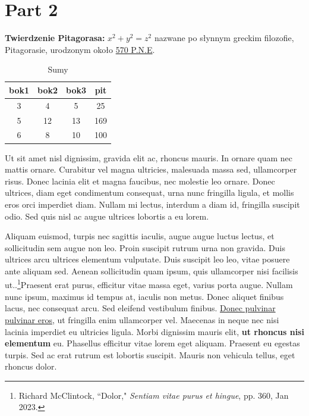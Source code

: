 \documentclass[12pt,a4paper]{article}
\begin{document}
\part{Part 2}
\textbf{Twierdzenie Pitagorasa:} \(x^2 + y^2 = z^2\) nazwane po słynnym greckim filozofie, Pitagorasie, urodzonym około \underline{570 P.N.E}.
\begin{table}[H]
		\centering
		\begin{tabular}{||c c c c||} 
			\hline
			bok1 & bok2 & bok3 & pit \\ [0.5ex] 
			\hline\hline
			3 & 4 & 5 & 25 \\ 
			\hline
			5 & 12 & 13 & 169 \\
			\hline
			6 & 8 & 10 & 100 \\ [1ex] 
			\hline
		\end{tabular}
\caption{Sumy}
\label{table: Sumy}
\end{table}
Ut sit amet nisl dignissim, gravida elit ac, rhoncus mauris. \cite{A2} In ornare quam nec mattis ornare. Curabitur vel magna ultricies, malesuada massa sed, ullamcorper risus. Donec lacinia elit et magna faucibus, nec molestie leo ornare. Donec ultrices, diam eget condimentum consequat, urna nunc fringilla ligula, et mollis eros orci imperdiet diam. Nullam mi lectus, interdum a diam id, fringilla suscipit odio. Sed quis nisl ac augue ultrices lobortis a eu lorem.

Aliquam euismod, turpis nec sagittis iaculis, augue augue luctus lectus, et sollicitudin sem augue non leo. Proin suscipit rutrum urna non gravida. Duis ultrices arcu ultrices elementum vulputate. Duis suscipit leo leo, vitae posuere ante aliquam sed. Aenean sollicitudin quam ipsum, quis ullamcorper nisi facilisis ut..\footnote{Richard McClintock, ``Dolor," \emph{Sentiam vitae purus et hingue}, pp. 360, Jan 2023.}Praesent erat purus, efficitur vitae massa eget, varius porta augue. Nullam nunc ipsum, maximus id tempus at, iaculis non metus. Donec aliquet finibus lacus, nec consequat arcu. Sed eleifend vestibulum finibus.  \underline{Donec pulvinar pulvinar eros}, ut fringilla enim ullamcorper vel. Maecenas in neque nec nisi lacinia imperdiet eu ultricies ligula. Morbi dignissim mauris elit, \textbf{ut rhoncus nisi elementum} eu. Phasellus efficitur vitae lorem eget aliquam. Praesent eu egestas turpis. Sed ac erat rutrum est lobortis suscipit. Mauris non vehicula tellus, eget rhoncus dolor.
\end{document}

